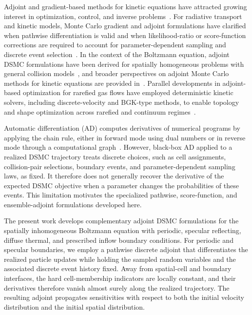 \documentclass[12pt,nopreprintline]{elsarticle}
\begin{document}
Adjoint and gradient-based methods for kinetic equations have attracted growing interest in optimization, control, and inverse problems~\cite{mohamed2020monte,lovbak2022reversible}. For radiative transport and kinetic models, Monte Carlo gradient and adjoint formulations have clarified when pathwise differentiation is valid and when likelihood-ratio or score-function corrections are required to account for parameter-dependent sampling and discrete event selection~\cite{li2022monte,yang2023adjoint,ni2025ergodic}. In the context of the Boltzmann equation, adjoint DSMC formulations have been derived for spatially homogeneous problems with general collision models~\cite{caflisch2021adjoint,yang2023adjoint}, and broader perspectives on adjoint Monte Carlo methods for kinetic equations are provided in~\cite{caflisch2024adjoint}. Parallel developments in adjoint-based optimization for rarefied gas flows have employed deterministic kinetic solvers, including discrete-velocity and BGK-type methods, to enable topology and shape optimization across rarefied and continuum regimes~\cite{guan2024topology,yuan2024design,yuan2025adjoint}.

{Automatic differentiation (AD) computes derivatives of numerical programs by applying the chain rule, either in forward mode using dual numbers or in reverse mode through a computational graph~\cite{GriewankWalther2008,Baydin2018,Sapienza2024}. However, black-box AD applied to a realized DSMC trajectory treats discrete choices, such as cell assignments, collision-pair selections, boundary events, and parameter-dependent sampling laws, as fixed. It therefore does not generally recover the derivative of the expected DSMC objective when a parameter changes the probabilities of these events. This limitation motivates the specialized pathwise, score-function, and ensemble-adjoint formulations developed here.}

The present work develops complementary adjoint DSMC formulations for the spatially inhomogeneous Boltzmann equation with periodic, specular reflecting, diffuse thermal, and prescribed inflow boundary conditions. For periodic and specular boundaries, we employ a pathwise discrete adjoint that differentiates the realized particle updates while holding the sampled random variables and the associated discrete event history fixed. Away from spatial-cell and boundary interfaces, the hard cell-membership indicators are locally constant, and their derivatives therefore vanish almost surely along the realized trajectory. The resulting adjoint propagates sensitivities with respect to both the initial velocity distribution and the initial spatial distribution.
\end{document}

